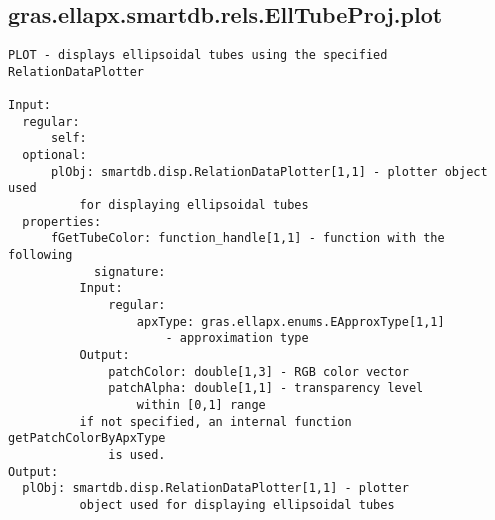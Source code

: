 \subsection{\texorpdfstring{gras.ellapx.smartdb.rels.EllTubeProj.plot}{plot}}\label{method:gras.ellapx.smartdb.rels.EllTubeProj.plot}
\begin{verbatim}
PLOT - displays ellipsoidal tubes using the specified RelationDataPlotter

Input:
  regular:
      self:
  optional:
      plObj: smartdb.disp.RelationDataPlotter[1,1] - plotter object used
          for displaying ellipsoidal tubes
  properties:
      fGetTubeColor: function_handle[1,1] - function with the following
            signature:
          Input:
              regular:
                  apxType: gras.ellapx.enums.EApproxType[1,1]
                      - approximation type
          Output:
              patchColor: double[1,3] - RGB color vector
              patchAlpha: double[1,1] - transparency level
                  within [0,1] range
          if not specified, an internal function getPatchColorByApxType
              is used.
Output:
  plObj: smartdb.disp.RelationDataPlotter[1,1] - plotter
          object used for displaying ellipsoidal tubes
\end{verbatim}
